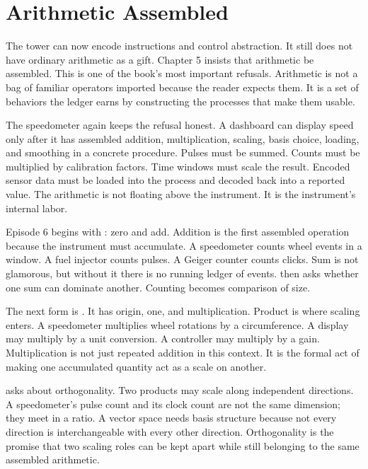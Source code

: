 \section{Arithmetic Assembled}
\label{se:arithmetic-assembled}

The tower can now encode instructions and control abstraction. It still does
not have ordinary arithmetic as a gift. Chapter 5 insists that arithmetic be
assembled. This is one of the book's most important refusals. Arithmetic is
not a bag of familiar operators imported because the reader expects them. It
is a set of behaviors the ledger earns by constructing the processes that make
them usable.

The speedometer again keeps the refusal honest. A dashboard can display speed
only after it has assembled addition, multiplication, scaling, basis choice,
loading, and smoothing in a concrete procedure. Pulses must be summed. Counts
must be multiplied by calibration factors. Time windows must scale the result.
Encoded sensor data must be loaded into the process and decoded back into a
reported value. The arithmetic is not floating above the instrument. It is the
instrument's internal labor.

Episode 6 begins with : zero and add. Addition is the first
assembled operation because the instrument must accumulate. A speedometer
counts wheel events in a window. A fuel injector counts pulses. A Geiger
counter counts clicks. Sum is not glamorous, but without it there is no
running ledger of events.  then asks whether one sum can
dominate another. Counting becomes comparison of size.

The next form is . It has origin, one, and multiplication.
Product is where scaling enters. A speedometer multiplies wheel rotations by a
circumference. A display may multiply by a unit conversion. A controller may
multiply by a gain. Multiplication is not just repeated addition in this
context. It is the formal act of making one accumulated quantity act as a
scale on another.

 asks about orthogonality. Two products may scale along
independent directions. A speedometer's pulse count and its clock count are
not the same dimension; they meet in a ratio. A vector space needs basis
structure because not every direction is interchangeable with every other
direction. Orthogonality is the promise that two scaling roles can be kept
apart while still belonging to the same assembled arithmetic.

